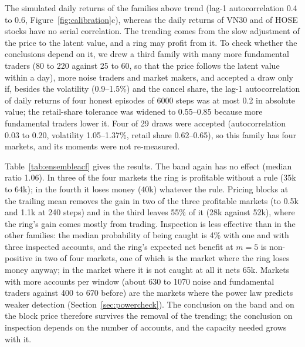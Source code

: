 The simulated daily returns of the families above trend (lag-1 autocorrelation 0.4 to 0.6, Figure~\ref{fig:calibration}c), whereas the daily returns of VN30 and of HOSE stocks have no serial correlation. The trending comes from the slow adjustment of the price to the latent value, and a ring may profit from it. To check whether the conclusions depend on it, we drew a third family with many more fundamental traders (80 to 220 against 25 to 60, so that the price follows the latent value within a day), more noise traders and market makers, and accepted a draw only if, besides the volatility (0.9--1.5\%) and the cancel share, the lag-1 autocorrelation of daily returns of four honest episodes of 6000 steps was at most 0.2 in absolute value; the retail-share tolerance was widened to 0.55--0.85 because more fundamental traders lower it. Four of 29 draws were accepted (autocorrelation 0.03 to 0.20, volatility 1.05--1.37\%, retail share 0.62--0.65), so this family has four markets, and its moments were not re-measured.

Table~\ref{tab:ensembleacf} gives the results. The band again has no effect (median ratio 1.06). In three of the four markets the ring is profitable without a rule (35k to 64k); in the fourth it loses money (\textminus40k) whatever the rule. Pricing blocks at the trailing mean removes the gain in two of the three profitable markets (to \textminus0.5k and \textminus1.1k at 240 steps) and in the third leaves 55\% of it (28k against 52k), where the ring's gain comes mostly from trading. Inspection is less effective than in the other families: the median probability of being caught is 4\% with one and with three inspected accounts, and the ring's expected net benefit at $m=5$ is non-positive in two of four markets, one of which is the market where the ring loses money anyway; in the market where it is not caught at all it nets 65k. Markets with more accounts per window (about 630 to 1070 noise and fundamental traders against 400 to 670 before) are the markets where the power law predicts weaker detection (Section~\ref{sec:powercheck}). The conclusion on the band and on the block price therefore survives the removal of the trending; the conclusion on inspection depends on the number of accounts, and the capacity needed grows with it.

\begin{table}[t]
\centering\footnotesize
{}
\caption{Family of four markets without trending daily returns (lag-1 autocorrelation of at most 0.2): the ring's gain against each policy, as in Table~\ref{tab:ensemble}.}\label{tab:ensembleacf}
\end{table}


